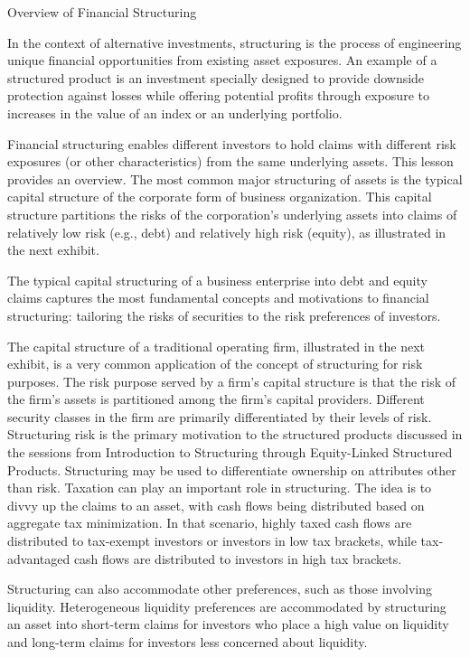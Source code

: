 \documentclass[11pt]{article}
\begin{document}
Overview of Financial Structuring

In the context of alternative investments, structuring is the process of engineering unique financial opportunities from existing asset exposures. An example of a structured product is an investment specially designed to provide downside protection against losses while offering potential profits through exposure to increases in the value of an index or an underlying portfolio.

Financial structuring enables different investors to hold claims with different risk exposures (or other characteristics) from the same underlying assets. This lesson provides an overview. The most common major structuring of assets is the typical capital structure of the corporate form of business organization. This capital structure partitions the risks of the corporation's underlying assets into claims of relatively low risk (e.g., debt) and relatively high risk (equity), as illustrated in the next exhibit.

The typical capital structuring of a business enterprise into debt and equity claims captures the most fundamental concepts and motivations to financial structuring: tailoring the risks of securities to the risk preferences of investors.

The capital structure of a traditional operating firm, illustrated in the next exhibit, is a very common application of the concept of structuring for risk purposes. The risk purpose served by a firm's capital structure is that the risk of the firm's assets is partitioned among the firm's capital providers. Different security classes in the firm are primarily differentiated by their levels of risk. Structuring risk is the primary motivation to the structured products discussed in the sessions from Introduction to Structuring through Equity-Linked Structured Products. Structuring may be used to differentiate ownership on attributes other than risk. Taxation can play an important role in structuring. The idea is to divvy up the claims to an asset, with cash flows being distributed based on aggregate tax minimization. In that scenario, highly taxed cash flows are distributed to tax-exempt investors or investors in low tax brackets, while tax-advantaged cash flows are distributed to investors in high tax brackets.

Structuring can also accommodate other preferences, such as those involving liquidity. Heterogeneous liquidity preferences are accommodated by structuring an asset into short-term claims for investors who place a high value on liquidity and long-term claims for investors less concerned about liquidity.
\end{document}
